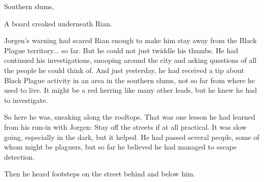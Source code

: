 \begin{comment}
\section{Rian and the Black Plague}
\end{comment}
\stamp
  {\dateRianSeesMagicRitual}
  {Southern slums, }
\begin{comment}
\subsection{Dangerous ground}
\end{comment}

A board creaked underneath Rian. 


Jorgen's warning had scared Rian enough to make him stay away from the Black Plague territory... so far.  
But he could not just twiddle his thumbs. 
He had continued his investigations, snooping around the city and asking questions of all the people he could think of. 
And just yesterday, he had received a tip about Black Plague activity in an area in the southern slums, not so far from where he used to live. 
It might be a red herring like many other leads, but he knew he had to investigate. 

So here he was, sneaking along the rooftops. 
That was one lesson he had learned from his run-in with Jorgen: 
Stay off the streets if at all practical. 
It was slow going, especially in the dark, but it helped. 
He had passed several people, some of whom might be plaguers, but so far he believed he had managed to escape detection. 


Then he heard footsteps on the street behind and below him. 

